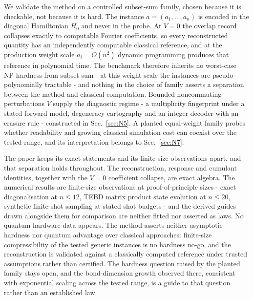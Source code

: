 We validate the method on a controlled subset-sum family, chosen because it is checkable, not because it is hard. The instance $a = (a_1, \ldots, a_n)$ is encoded in the diagonal Hamiltonian $H_0$ and never in the probe. At $V = 0$ the overlap record collapses exactly to computable Fourier coefficients, so every reconstructed quantity has an independently computable classical reference, and at the production weight scale $a_i = O(n^2)$ dynamic programming produces that reference in polynomial time. The benchmark therefore inherits no worst-case NP-hardness from subset-sum - at this weight scale the instances are pseudo-polynomially tractable - and nothing in the choice of family asserts a separation between the method and classical computation. Bounded noncommuting perturbations $V$ supply the diagnostic regime - a multiplicity fingerprint under a stated forward model, degeneracy cartography and an integer decoder with an erasure rule - constructed in Sec.~\ref{sec:N5}. A planted equal-weight family probes whether readability and growing classical simulation cost can coexist over the tested range, and its interpretation belongs to Sec.~\ref{sec:N7}.

The paper keeps its exact statements and its finite-size observations apart, and that separation holds throughout. The reconstruction, response and cumulant identities, together with the $V = 0$ coefficient collapse, are exact algebra. The numerical results are finite-size observations at proof-of-principle sizes - exact diagonalisation at $n \le 12$, TEBD matrix product state evolution at $n \le 20$, synthetic finite-shot sampling at stated shot budgets - and the derived guides drawn alongside them for comparison are neither fitted nor asserted as laws. No quantum hardware data appears. The method asserts neither asymptotic hardness nor quantum advantage over classical approaches: finite-size compressibility of the tested generic instances is no hardness no-go, and the reconstruction is validated against a classically computed reference under trusted assumptions rather than certified. The hardness question raised by the planted family stays open, and the bond-dimension growth observed there, consistent with exponential scaling across the tested range, is a guide to that question rather than an established law.

